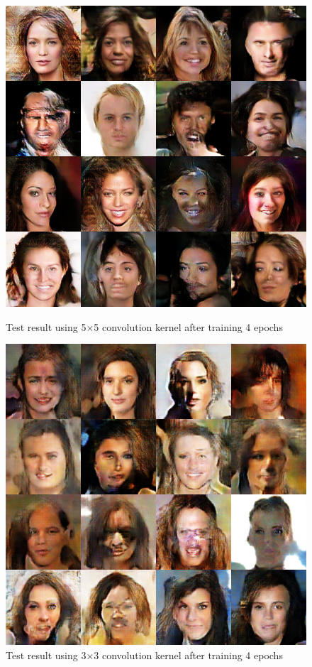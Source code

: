 \begin{figure}
    \begin{minipage}[t]{0.48\linewidth}
        \centering
        \includegraphics[width=\textwidth]{figures/result_conv_kernel_5.png}
        \caption{Test result using 5×5 convolution kernel after training 4 epochs}
        \label{conv_kernel_5}
    \end{minipage}
        \hfill
    \begin{minipage}[t]{0.48\linewidth}
        \centering
        \includegraphics[width=\textwidth]{figures/result_conv_kernel_3.png}
        \caption{Test result using 3×3 convolution kernel after training 4 epochs}
        \label{conv_kernel_3}
    \end{minipage}
\end{figure}


